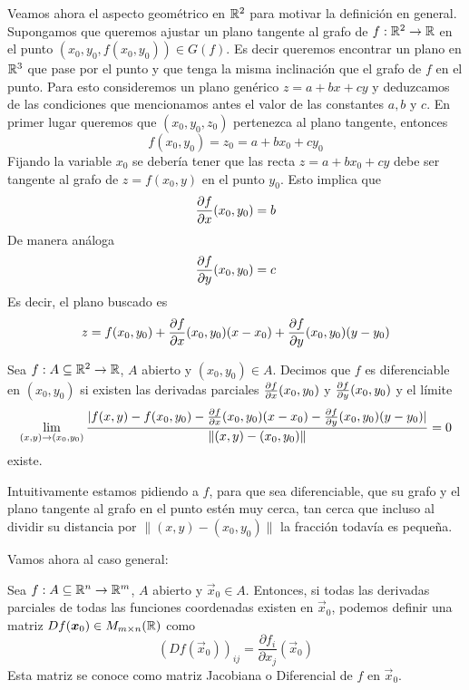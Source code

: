 Veamos ahora el aspecto geom\'etrico en $\mathbb{R}^2$ para motivar 
la definici\'on en general.
Supongamos que queremos ajustar un plano tangente al grafo de $f:\mathbb{R}^2\to\mathbb{R}$ 
en el punto $(x_0,y_0,f(x_0,y_0))\in G(f)$. Es decir queremos 
encontrar un plano en $\mathbb{R}^3$ que pase por el punto y que 
tenga la misma inclinaci\'on que el grafo de $f$ en el punto. 
Para 
esto consideremos  un plano gen\'erico $z=a+bx+cy$ y deduzcamos de 
las condiciones que mencionamos antes el valor de las constantes $a,b$ y $c$. 
En primer lugar queremos que $(x_0,y_0,z_0)$ pertenezca al plano tangente, entonces
$$f(x_0,y_0)=z_0=a+bx_0+cy_0$$
Fijando la variable $x_0$ se deber\'ia tener que las recta $z=a+bx_0+cy$ debe
ser tangente al grafo de $z=f(x_0,y)$ en el punto $y_0$. Esto implica que
$$\frac{\partial f}{\partial x}(x_0,y_0)=b$$
De manera an\'aloga
$$\frac{\partial f}{\partial y}(x_0,y_0)=c$$
Es decir, el plano buscado es
$$z=f(x_0,y_0)+\frac{\partial f}{\partial x}(x_0,y_0)(x-x_0)+\frac{\partial f}{\partial y}(x_0,y_0)(y-y_0)$$  
 
\begin{definicion} Sea $f:A\subseteq\mathbb{R}^2\to\mathbb{R}$, $A$ abierto 
y $(x_0,y_0)\in A$. Decimos que $f$ es diferenciable en $(x_0,y_0)$ si 
existen las derivadas parciales $\frac{\partial f}{\partial x}(x_0,y_0)$ y $\frac{\partial f}{\partial y}(x_0,y_0)$  y el l\'imite
\begin{equation*}
\lim_{(x,y)\to (x_0,y_0)}\frac{|f(x,y)-f(x_0,y_0)-
\frac{\partial f}{\partial x}(x_0,y_0)(x-x_0)-\frac{\partial f}{\partial y}(x_0,y_0)(y-y_0)|}{\|(x,y)-(x_0,y_0)\|}=0
\end{equation*}
existe.
\end{definicion}

Intuitivamente estamos pidiendo a $f$, para que sea diferenciable, que su grafo 
y el plano tangente al grafo en el punto est\'en muy cerca, tan cerca que incluso 
al dividir su distancia por $\|(x,y)-(x_0,y_0)\|$ la fracci\'on todav\'ia 
es peque\~na.

Vamos ahora al caso general:
\begin{definicion} Sea $f:A\subseteq\mathbb{R}^n\to\mathbb{R}^m$, $A$ abierto y $\vec{x}_0\in A$. 
Entonces, si todas las derivadas parciales de todas las funciones coordenadas 
existen en $\vec{x}_0$, podemos definir una matriz
$Df(\boldsymbol{x}_0)\in M_{m\times n}(\mathbb{R})$ como
$$(Df(\vec{x}_0))_{ij}=\frac{\partial f_i}{\partial x_j}(\vec{x}_0)$$
Esta matriz se conoce como  matriz Jacobiana  o Diferencial  de $f$ en $\vec{x}_0$.
\end{definicion}

